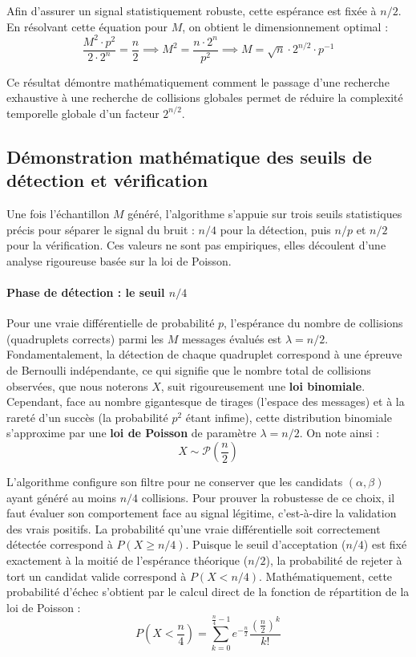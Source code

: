 \documentclass[a4paper,11pt]{article}
\begin{document}
Afin d'assurer un signal statistiquement robuste, cette espérance est fixée à $n/2$. En résolvant cette équation pour $M$, on obtient le dimensionnement optimal :
\begin{equation*}
    \frac{M^2 \cdot p^2}{2 \cdot 2^n} = \frac{n}{2} \implies M^2 = \frac{n \cdot 2^n}{p^2} \implies M = \sqrt{n} \cdot 2^{n/2} \cdot p^{-1}
\end{equation*}

Ce résultat démontre mathématiquement comment le passage d'une recherche exhaustive à une recherche de collisions globales permet de réduire la complexité temporelle globale d'un facteur $2^{n/2}$.

\subsection{Démonstration mathématique des seuils de détection et vérification}

Une fois l'échantillon $M$ généré, l'algorithme s'appuie sur trois seuils statistiques précis pour séparer le signal du bruit : $n/4$ pour la détection, puis $n/p$ et $n/2$ pour la vérification. Ces valeurs ne sont pas empiriques, elles découlent d'une analyse rigoureuse basée sur la loi de Poisson.

\paragraph{Phase de détection : le seuil $n/4$}

Pour une vraie différentielle de probabilité $p$, l'espérance du nombre de collisions (quadruplets corrects) parmi les $M$ messages évalués est $\lambda = n/2$. Fondamentalement, la détection de chaque quadruplet correspond à une épreuve de Bernoulli indépendante, ce qui signifie que le nombre total de collisions observées, que nous noterons $X$, suit rigoureusement une \textbf{loi binomiale}. Cependant, face au nombre gigantesque de tirages (l'espace des messages) et à la rareté d'un succès (la probabilité $p^2$ étant infime), cette distribution binomiale s'approxime par une \textbf{loi de Poisson} de paramètre $\lambda = n/2$. On note ainsi :
\begin{equation*}
    X \sim \mathcal{P}\left(\frac{n}{2}\right)
\end{equation*}

L'algorithme configure son filtre pour ne conserver que les candidats $(\alpha, \beta)$ ayant généré au moins $n/4$ collisions. Pour prouver la robustesse de ce choix, il faut évaluer son comportement face au signal légitime, c'est-à-dire la validation des vrais positifs. La probabilité qu'une vraie différentielle soit correctement détectée correspond à $P(X \ge n/4)$. Puisque le seuil d'acceptation ($n/4$) est fixé exactement à la moitié de l'espérance théorique ($n/2$), la probabilité de rejeter à tort un candidat valide correspond à $P(X < n/4)$. Mathématiquement, cette probabilité d'échec s'obtient par le calcul direct de la fonction de répartition de la loi de Poisson :
\begin{equation*}
    P\left(X < \frac{n}{4}\right) = \sum_{k=0}^{\frac{n}{4}-1} e^{-\frac{n}{2}} \frac{\left(\frac{n}{2}\right)^k}{k!}
\end{equation*}
\end{document}
